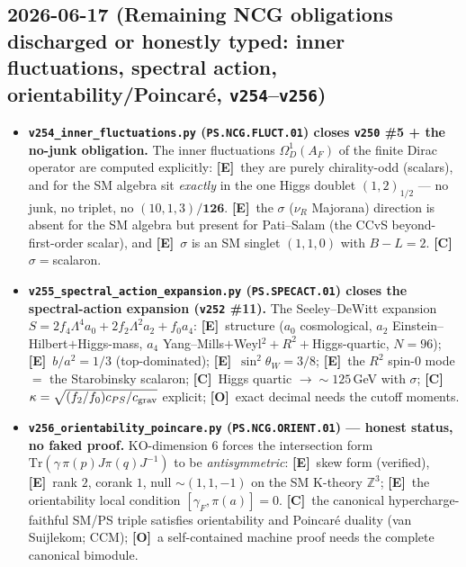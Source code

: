 \documentclass[11pt]{article}
\providecommand{\mE}{\textbf{[E]}}\providecommand{\mC}{\textbf{[C]}}
\providecommand{\mO}{\textbf{[O]}}\providecommand{\mX}{\textbf{[X]}}
\providecommand{\vref}[1]{\texttt{#1}}
\begin{document}
\subsection*{2026-06-17 (Remaining NCG obligations discharged or honestly typed: inner fluctuations, spectral action, orientability/Poincar\'e, \texttt{v254}--\texttt{v256})}
\begin{itemize}
\item \textbf{\texttt{v254\_inner\_fluctuations.py} (\texttt{PS.NCG.FLUCT.01}) closes \vref{v250} \#5 + the
  no-junk obligation.} The inner fluctuations $\Omega^1_D(A_F)$ of the finite Dirac operator are computed
  explicitly: \mE\ they are purely chirality-odd (scalars), and for the SM algebra sit \emph{exactly} in the
  one Higgs doublet $(1,2)_{1/2}$ --- no junk, no triplet, no $(10,1,3)/\mathbf{126}$. \mE\ the $\sigma$
  ($\nu_R$ Majorana) direction is absent for the SM algebra but present for Pati--Salam (the CCvS
  beyond-first-order scalar), and \mE\ $\sigma$ is an SM singlet $(1,1,0)$ with $B{-}L=2$. \mC\
  $\sigma={}$scalaron.
\item \textbf{\texttt{v255\_spectral\_action\_expansion.py} (\texttt{PS.SPECACT.01}) closes the
  spectral-action expansion (\vref{v252} \#11).} The Seeley--DeWitt expansion
  $S=2f_4\Lambda^4 a_0+2f_2\Lambda^2 a_2+f_0 a_4$: \mE\ structure ($a_0$ cosmological, $a_2$
  Einstein--Hilbert$+$Higgs-mass, $a_4$ Yang--Mills$+$Weyl$^2+R^2+$Higgs-quartic, $N=96$); \mE\ $b/a^2=1/3$
  (top-dominated); \mE\ $\sin^2\theta_W=3/8$; \mE\ the $R^2$ spin-$0$ mode $=$ the Starobinsky scalaron; \mC\
  Higgs quartic $\to{\sim}125$\,GeV with $\sigma$; \mC\ $\kappa=\sqrt{(f_2/f_0)c_{PS}/c_{\rm grav}}$ explicit;
  \mO\ exact decimal needs the cutoff moments.
\item \textbf{\texttt{v256\_orientability\_poincare.py} (\texttt{PS.NCG.ORIENT.01}) --- honest status, no
  faked proof.} KO-dimension $6$ forces the intersection form $\mathrm{Tr}(\gamma\,\pi(p)J\pi(q)J^{-1})$ to be
  \emph{antisymmetric}: \mE\ skew form (verified), \mE\ rank $2$, corank $1$, null $\sim(1,1,-1)$ on the SM
  K-theory $\mathbb Z^3$; \mE\ the orientability local condition $[\gamma_F,\pi(a)]=0$. \mC\ the canonical
  hypercharge-faithful SM/PS triple satisfies orientability and Poincar\'e duality (van Suijlekom; CCM); \mO\
  a self-contained machine proof needs the complete canonical bimodule.
\end{itemize}
\end{document}
